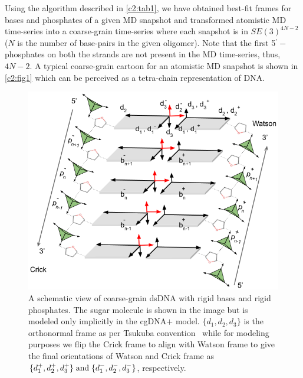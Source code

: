 \clearpage
Using the algorithm described in \cref{c2:tab1}, we have obtained best-fit frames for bases and phosphates of a given 
MD snapshot and transformed atomistic MD time-series into a coarse-grain time-series where each snapshot is in $SE(3)^{4N-2}$ ($N$ is the number of base-pairs in the given oligomer).
Note that the first 5$^\prime-$phosphates on both the strands are not present in the MD time-series, thus, $4N-2$.
A typical coarse-grain cartoon for an atomistic MD snapshot is shown in \cref{c2:fig1} which can be perceived as a tetra-chain representation of DNA.

\begin{figure}[htb]
\begin{center}
\centering\includegraphics[scale=0.55]{images/Coords.png}
\centering\caption{A schematic view of coarse-grain dsDNA with rigid bases and rigid phosphates. 
The sugar molecule is shown in the image but is modeled only implicitly in the cgDNA$+$ model.
$\{d_1,d_2,d_3\}$ is the orthonormal frame as per Tsukuba convention~\cite{tsukuba} while for modeling purposes we flip the Crick frame to align with Watson frame to give the final orientations of Watson and Crick frame as $\{d_1^+,d_2^+,d_3^+\} {\;\text{and\;}} \{d_1^-,d_2^-,d_3^-\}$, respectively.  
}
\label{c2:fig2}
\end{center}
\end{figure}

